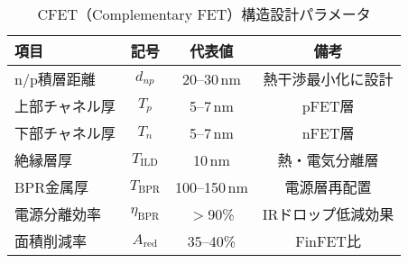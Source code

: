 \begin{table}[t]
  \centering
  \caption{CFET（Complementary FET）構造設計パラメータ}
  \label{tab:cfet_stack}
  \begin{tabular}{lccc}
    \toprule
    項目 & 記号 & 代表値 & 備考 \\
    \midrule
    n/p積層距離 & $d_{np}$ & 20–30\,nm & 熱干渉最小化に設計 \\
    上部チャネル厚 & $T_p$ & 5–7\,nm & pFET層 \\
    下部チャネル厚 & $T_n$ & 5–7\,nm & nFET層 \\
    絶縁層厚 & $T_\mathrm{ILD}$ & 10\,nm & 熱・電気分離層 \\
    BPR金属厚 & $T_\mathrm{BPR}$ & 100–150\,nm & 電源層再配置 \\
    電源分離効率 & $\eta_\mathrm{BPR}$ & $>$90\% & IRドロップ低減効果 \\
    面積削減率 & $A_\mathrm{red}$ & 35–40\% & FinFET比 \\
    \bottomrule
  \end{tabular}
\end{table}
